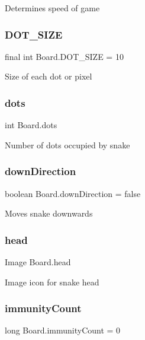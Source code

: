 Determines speed of game \mbox{\label{class_board_a142327cbac30c9c8831b197cdd2e9a36}} 
\subsubsection{\texorpdfstring{D\+O\+T\+\_\+\+S\+I\+ZE}{DOT\_SIZE}}
{\footnotesize\ttfamily final int Board.\+D\+O\+T\+\_\+\+S\+I\+ZE = 10}

Size of each dot or \textquotesingle{}pixel\textquotesingle{} \mbox{\label{class_board_ac2d4eeff3a96ccb227e8cc38ff803d50}} 
\subsubsection{\texorpdfstring{dots}{dots}}
{\footnotesize\ttfamily int Board.\+dots}

Number of dots occupied by snake \mbox{\label{class_board_a2c4b39d098ee72bb293cbc75ba7c3ace}} 
\subsubsection{\texorpdfstring{down\+Direction}{downDirection}}
{\footnotesize\ttfamily boolean Board.\+down\+Direction = false}

Moves snake downwards \mbox{\label{class_board_aa1544ac7c813a0a8ba3aec1e46c60971}} 
\subsubsection{\texorpdfstring{head}{head}}
{\footnotesize\ttfamily Image Board.\+head}

Image icon for snake head \mbox{\label{class_board_a74f7919c59b8bd512e8ff8a922583822}} 
\subsubsection{\texorpdfstring{immunity\+Count}{immunityCount}}
{\footnotesize\ttfamily long Board.\+immunity\+Count = 0}

